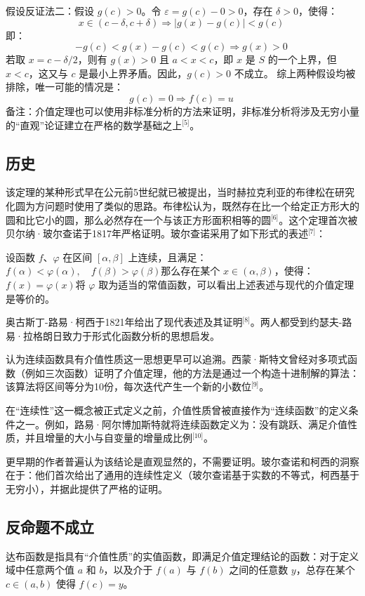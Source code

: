 假设反证法二：假设 $g(c) > 0$。令 $\varepsilon = g(c) - 0 > 0$，存在 $\delta > 0$，使得：
$$
x \in (c - \delta, c + \delta) \Rightarrow |g(x) - g(c)| < g(c)~
$$
即：
$$
-g(c) < g(x) - g(c) < g(c) \Rightarrow g(x) > 0~
$$
若取 $x = c - \delta/2$，则有 $g(x) > 0$ 且 $a < x < c$，即 $x$ 是 $S$ 的一个上界，但 $x < c$，这又与 $c$ 是最小上界矛盾。因此，$g(c) > 0$ 不成立。
综上两种假设均被排除，唯一可能的情况是：
$$
g(c) = 0 \Rightarrow f(c) = u~
$$
备注：介值定理也可以使用非标准分析的方法来证明，非标准分析将涉及无穷小量的“直观”论证建立在严格的数学基础之上\(^\text{[5]}\)。
\subsection{历史}
该定理的某种形式早在公元前5世纪就已被提出，当时赫拉克利亚的布律松在研究化圆为方问题时使用了类似的思路。布律松认为，既然存在比一个给定正方形大的圆和比它小的圆，那么必然存在一个与该正方形面积相等的圆\(^\text{[6]}\)。这个定理首次被贝尔纳·玻尔查诺于1817年严格证明。玻尔查诺采用了如下形式的表述\(^\text{[7]}\)：

设函数 $f$、$\varphi$ 在区间 $[\alpha, \beta]$ 上连续，且满足：$f(\alpha) < \varphi(\alpha), \quad f(\beta) > \varphi(\beta)$那么存在某个 $x \in (\alpha, \beta)$，使得：$f(x) = \varphi(x)$将 $\varphi$ 取为适当的常值函数，可以看出上述表述与现代的介值定理是等价的。

奥古斯丁-路易·柯西于1821年给出了现代表述及其证明\(^\text{[8]}\)。两人都受到约瑟夫-路易·拉格朗日致力于形式化函数分析的思想启发。

认为连续函数具有介值性质这一思想更早可以追溯。西蒙·斯特文曾经对多项式函数（例如三次函数）证明了介值定理，他的方法是通过一个构造十进制解的算法：该算法将区间等分为10份，每次迭代产生一个新的小数位\(^\text{[9]}\)。

在“连续性”这一概念被正式定义之前，介值性质曾被直接作为“连续函数”的定义条件之一。例如，路易·阿尔博加斯特就将连续函数定义为：没有跳跃、满足介值性质，并且增量的大小与自变量的增量成比例\(^\text{[10]}\)。

更早期的作者普遍认为该结论是直观显然的，不需要证明。玻尔查诺和柯西的洞察在于：他们首次给出了通用的连续性定义（玻尔查诺基于实数的不等式，柯西基于无穷小），并据此提供了严格的证明。
\subsection{反命题不成立}
达布函数是指具有“介值性质”的实值函数，即满足介值定理结论的函数：对于定义域中任意两个值 $a$ 和 $b$，以及介于 $f(a)$ 与 $f(b)$ 之间的任意数 $y$，总存在某个 $c \in (a, b)$ 使得 $f(c) = y$。

